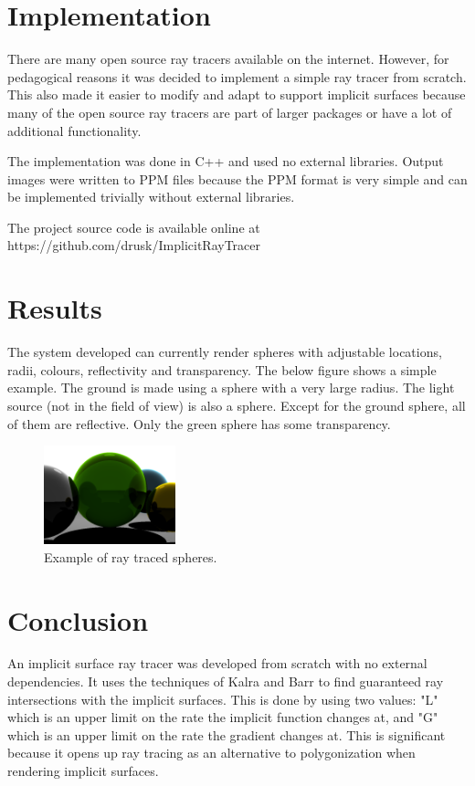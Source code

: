 \documentclass[conference]{acmsiggraph}
\begin{document}
\section{Implementation}

There are many open source ray tracers available on the internet.  However, 
for pedagogical reasons it was decided to implement a simple ray tracer from 
scratch.  This also made it easier to modify and adapt to support implicit
surfaces because many of the open source ray tracers are part of larger 
packages or have a lot of additional functionality.

The implementation was done in C++ and used no external libraries.  Output 
images were written to PPM \cite{PPM} files because the PPM format is 
very simple and can be implemented trivially without external libraries.

The project source code is available online at 
https://github.com/drusk/ImplicitRayTracer

\section{Results}

The system developed can currently render spheres with adjustable locations,
radii, colours, reflectivity and transparency.  The below figure shows a
simple example.  The ground is made using a sphere with a very large radius.
The light source (not in the field of view) is also a sphere.  Except for the
ground sphere, all of them are reflective.  Only the green sphere has some
transparency.

\begin{figure}[ht]
  \centering
  \includegraphics[width=1.5in]{figures/spheres.png}
  \caption{Example of ray traced spheres.}
\end{figure}

\section{Conclusion}

An implicit surface ray tracer was developed from scratch with no external
dependencies.  It uses the techniques of Kalra and Barr \cite{KalraBarr1989}
to find guaranteed ray intersections with the implicit surfaces.  This is done
by using two values: "L" which is an upper limit on the rate the implicit
function changes at, and "G" which is an upper limit on the rate the gradient
changes at.  This is significant because it opens up ray tracing as an 
alternative to polygonization when rendering implicit surfaces.
\end{document}
